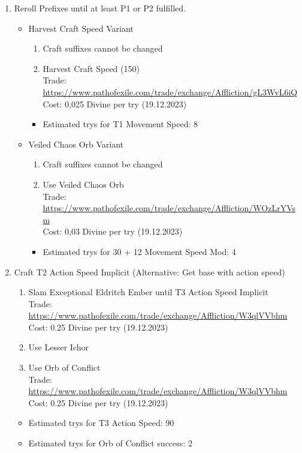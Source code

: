 \begin{enumerate}
	\item Reroll Prefixes until at least P1 or P2 fulfilled.
	\begin{itemize}
		\item Harvest Craft Speed Variant
		\begin{enumerate}
			\item Craft suffixes cannot be changed
			\item Harvest Craft Speed (150)\\
				Trade: \url{https://www.pathofexile.com/trade/exchange/Affliction/gL3WvL6iQ}\\
				Cost: 0,025 Divine per try (19.12.2023)
		\end{enumerate}
		\begin{itemize}
			\item Estimated trys for T1 Movement Speed: 8
		\end{itemize}
		\item Veiled Chaos Orb Variant
		\begin{enumerate}
			\item Craft suffixes cannot be changed
			\item Use Veiled Chaos Orb\\
				Trade: \url{https://www.pathofexile.com/trade/exchange/Affliction/WOzLrYVsm}\\
				Cost: 0,03 Divine per try (19.12.2023)
		\end{enumerate}
		\begin{itemize}
			\item Estimated trys for 30 + 12  Movement Speed Mod: 4
		\end{itemize}
	\end{itemize}
	\item Craft T2 Action Speed Implicit (Alternative: Get base with action speed)
		\begin{enumerate}
			\item Slam Exceptional Eldritch Ember until T3 Action Speed Implicit\\
				Trade: \url{https://www.pathofexile.com/trade/exchange/Affliction/W3qlVVbhm}\\
				Cost: 0.25 Divine per try (19.12.2023)
			\item Use Lesser Ichor
			\item Use Orb of Conflict\\
				Trade: \url{https://www.pathofexile.com/trade/exchange/Affliction/W3qlVVbhm}\\
				Cost: 0.25 Divine per try (19.12.2023)
		\end{enumerate}
		\begin{itemize}
			\item Estimated trys for T3 Action Speed: 90
			\item Estimated trys for Orb of Conflict success: 2
		\end{itemize}
\end{enumerate}

